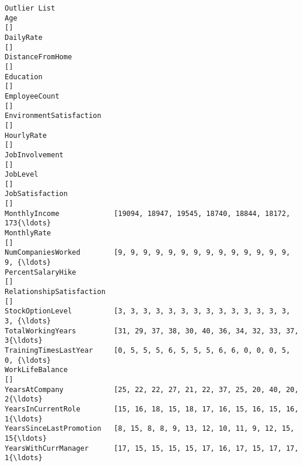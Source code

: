 \documentclass[11pt]{article}
\begin{document}
\begin{tcolorbox}[breakable, size=fbox, boxrule=.5pt, pad at break*=1mm, opacityfill=0]
\begin{Verbatim}[commandchars=\\\{\}]
                                                               Outlier List
Age                                                                      []
DailyRate                                                                []
DistanceFromHome                                                         []
Education                                                                []
EmployeeCount                                                            []
EnvironmentSatisfaction                                                  []
HourlyRate                                                               []
JobInvolvement                                                           []
JobLevel                                                                 []
JobSatisfaction                                                          []
MonthlyIncome             [19094, 18947, 19545, 18740, 18844, 18172, 173{\ldots}
MonthlyRate                                                              []
NumCompaniesWorked        [9, 9, 9, 9, 9, 9, 9, 9, 9, 9, 9, 9, 9, 9, 9, {\ldots}
PercentSalaryHike                                                        []
RelationshipSatisfaction                                                 []
StockOptionLevel          [3, 3, 3, 3, 3, 3, 3, 3, 3, 3, 3, 3, 3, 3, 3, {\ldots}
TotalWorkingYears         [31, 29, 37, 38, 30, 40, 36, 34, 32, 33, 37, 3{\ldots}
TrainingTimesLastYear     [0, 5, 5, 5, 6, 5, 5, 5, 6, 6, 0, 0, 0, 5, 0, {\ldots}
WorkLifeBalance                                                          []
YearsAtCompany            [25, 22, 22, 27, 21, 22, 37, 25, 20, 40, 20, 2{\ldots}
YearsInCurrentRole        [15, 16, 18, 15, 18, 17, 16, 15, 16, 15, 16, 1{\ldots}
YearsSinceLastPromotion   [8, 15, 8, 8, 9, 13, 12, 10, 11, 9, 12, 15, 15{\ldots}
YearsWithCurrManager      [17, 15, 15, 15, 15, 17, 16, 17, 15, 17, 17, 1{\ldots}
\end{Verbatim}
\end{tcolorbox}
        
\end{document}
